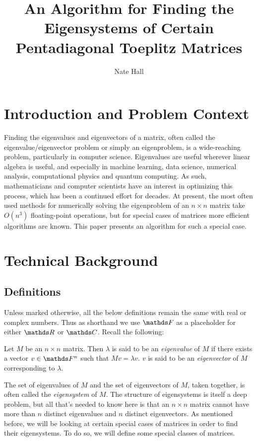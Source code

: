 \documentclass[10pt,twocolumn]{article}
\title{An Algorithm for Finding the Eigensystems of Certain\\ Pentadiagonal Toeplitz Matrices}
\author{Nate Hall}
\affiliation{Occidental College}
\begin{document}
\maketitle

\section{Introduction and Problem Context}

Finding the eigenvalues and eigenvectors of a matrix, often called the eigenvalue/eigenvector problem or simply an eigenproblem, is a wide-reaching problem, particularly in computer science. Eigenvalues are useful wherever linear algebra is useful, and especially in machine learning, data science, numerical analysis, computational physics and quantum computing.
As such, mathematicians and computer scientists have an interest in optimizing this process, which has been a continued effort for decades. At present, the most often used methods for numerically solving the eigenproblem of an $n\times n$ matrix take $O(n^3)$ floating-point operations, but for special cases of matrices more efficient algorithms are known. This paper presents an algorithm for such a special case.

\section{Technical Background}

\subsection{Definitions}
Unless marked otherwise, all the below definitions remain the same with real or complex numbers. Thus as shorthand we use $\bbF$ as a placeholder for either $\bbR$ or $\bbC$. Recall the following:

\begin{definition}
    Let $M$ be an $n\times n$ matrix. Then $\lambda$ is said to be an \textit{eigenvalue} of $M$ if there exists a vector $v\in \bbF^n$ such that $Mv=\lambda v$. $v$ is said to be an \textit{eigenvector} of $M$ corresponding to $\lambda$.
\end{definition}

The set of eigenvalues of $M$ and the set of eigenvectors of $M$, taken together, is often called the \textit{eigensystem} of $M$.
The structure of eigensystems is itself a deep problem, but all that's needed to know here is that an $n\times n$ matrix cannot have more than $n$ distinct eigenvalues and $n$ distinct eigenvectors. 
As mentioned before, we will be looking at certain special cases of matrices in order to find their eigensystems. To do so, we will define some special classes of matrices. 
\end{document}
